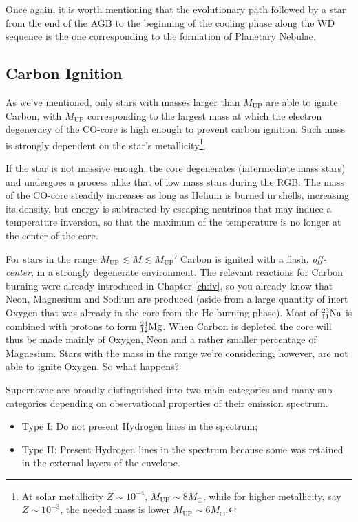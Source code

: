Once again, it is worth mentioning that the evolutionary path followed by a star from the end of the AGB to the beginning of the cooling phase along the WD sequence is the one corresponding to the formation of Planetary Nebulae.

\subsection{Carbon Ignition}

\par As we've mentioned, only stars with masses larger than $M_{\text{UP}}$ are able to ignite Carbon, with $M_{\text{UP}}$ corresponding to the largest mass at which the electron degeneracy of the CO-core is high enough to prevent carbon ignition. Such mass is strongly dependent on the star's metallicity\footnote{At solar metallicity $Z\sim 10^{-4}$, $M_{\text{UP}} \sim 8M_{\odot}$, while for higher metallicity, say $Z\sim 10^{-3}$, the needed mass is lower $M_{\text{UP}} \sim 6M_{\odot}$.}.
\par If the star is not massive enough, the core degenerates (intermediate mass stars) and undergoes a process alike that of low mass stars during the RGB: The mass of the CO-core steadily increases as long as Helium is burned in shells, increasing its density, but energy is subtracted by escaping neutrinos that may induce a temperature inversion, so that the maximum of the temperature is no longer at the center of the core.
\par For stars in the range $M_{\text{UP}} \lesssim M \lesssim M_{\text{UP}}'$ Carbon is ignited with a flash, \emph{off-center}, in a strongly degenerate environment. The relevant reactions for Carbon burning were already introduced in Chapter \ref{ch:iv}, so you already know that Neon, Magnesium and Sodium are produced (aside from a large quantity of inert Oxygen that was already in the core from the He-burning phase). Most of $\element{Na}{23}{11}$ is combined with protons to form $\element{Mg}{24}{12}$. When Carbon is depleted the core will thus be made mainly of Oxygen, Neon and a rather smaller percentage of Magnesium. Stars with the mass in the range we're considering, however, are not able to ignite Oxygen. So what happens?
\begin{tcolorbox}[enhanced,attach boxed title to top center={yshift=-3mm,yshifttext=-1mm},
colback=blue!5!white,colframe=blue!75!black,colbacktitle=blue!80!black,
title=Supernovae Classification,
boxed title style={size=small,colframe=blue!50!black}]
    Supernovae are broadly distinguished into two main categories and many sub-categories depending on observational properties of their emission spectrum.
    \begin{itemize}
        \item Type I: Do not present Hydrogen lines in the spectrum;
        \item Type II: Present Hydrogen lines in the spectrum because some was retained in the external layers of the envelope.
    \end{itemize}
\end{tcolorbox}
